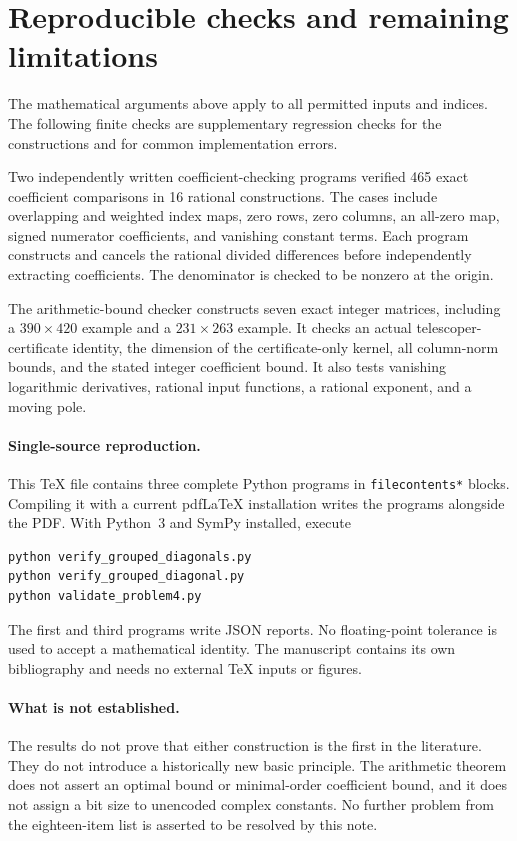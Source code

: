 \documentclass[11pt,a4paper]{article}
\theoremstyle{remark}\newtheorem{remark}[theorem]{Remark}
\begin{document}
\section{Reproducible checks and remaining limitations}
The mathematical arguments above apply to all permitted inputs and
indices. The following finite checks are supplementary regression checks
for the constructions and for common implementation errors.

Two independently written coefficient-checking programs verified
465 exact coefficient comparisons in 16 rational constructions.
The cases include overlapping and weighted index maps, zero rows,
zero columns, an all-zero map, signed numerator coefficients, and
vanishing constant terms. Each program constructs and cancels the
rational divided differences before independently extracting coefficients.
The denominator is checked to be nonzero at the origin.

The arithmetic-bound checker constructs seven exact integer matrices,
including a $390\times420$ example and a $231\times263$ example.
It checks an actual telescoper-certificate identity, the dimension of the
certificate-only kernel, all column-norm bounds, and the stated integer
coefficient bound. It also tests vanishing logarithmic derivatives,
rational input functions, a rational exponent, and a moving pole.

\paragraph{Single-source reproduction.}
This TeX file contains three complete Python programs in
\texttt{filecontents*} blocks. Compiling it with a current pdfLaTeX
installation writes the programs alongside the PDF. With Python~3 and
SymPy installed, execute
\begin{verbatim}
python verify_grouped_diagonals.py
python verify_grouped_diagonal.py
python validate_problem4.py
\end{verbatim}
The first and third programs write JSON reports. No floating-point
tolerance is used to accept a mathematical identity. The manuscript
contains its own bibliography and needs no external TeX inputs or figures.

\paragraph{What is not established.}
The results do not prove that either construction is the first in the
literature. They do not introduce a historically new basic principle.
The arithmetic theorem does not assert an optimal bound or minimal-order
coefficient bound, and it does not assign a bit size to unencoded complex
constants. No further problem from the eighteen-item list is asserted to
be resolved by this note.
\end{document}
